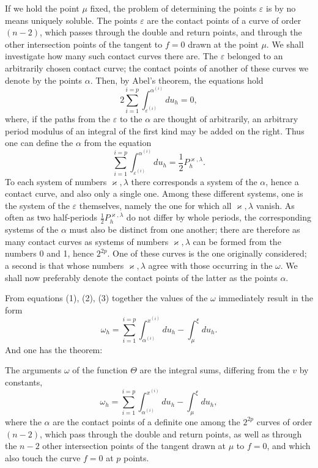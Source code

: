 \documentclass[10pt]{article}
\begin{document}
If we hold the point \(\mu\) fixed, the problem of determining the points \(\varepsilon\) is by no means uniquely soluble. The points \(\varepsilon\) are the contact points of a curve of order \((n-2)\), which passes through the double and return points, and through the other intersection points of the tangent to \(f=0\) drawn at the point \(\mu\). We shall investigate how many such contact curves there are. The \(\varepsilon\) belonged to an arbitrarily chosen contact curve; the contact points of another of these curves we denote by the points \(\alpha\). Then, by Abel's theorem, the equations hold
\[
2\sum_{i=1}^{i=p}\int_{\varepsilon^{(i)}}^{\alpha^{(i)}}du_h=0,
\]
where, if the paths from the \(\varepsilon\) to the \(\alpha\) are thought of arbitrarily, an arbitrary period modulus of an integral of the first kind may be added on the right. Thus one can define the \(\alpha\) from the equation
\[
\tag{3}\sum_{i=1}^{i=p}\int_{\varepsilon^{(i)}}^{\alpha^{(i)}}du_h=\frac12P_h^{\varkappa,\lambda}.
\]
To each system of numbers \(\varkappa,\lambda\) there corresponds a system of the \(\alpha\), hence a contact curve, and also only a single one. Among these different systems, one is the system of the \(\varepsilon\) themselves, namely the one for which all \(\varkappa,\lambda\) vanish. As often as two half-periods \(\frac12P_h^{\varkappa,\lambda}\) do not differ by whole periods, the corresponding systems of the \(\alpha\) must also be distinct from one another; there are therefore as many contact curves as systems of numbers \(\varkappa,\lambda\) can be formed from the numbers 0 and 1, hence \(2^{2p}\). One of these curves is the one originally considered; a second is that whose numbers \(\varkappa,\lambda\) agree with those occurring in the \(\omega\). We shall now preferably denote the contact points of the latter as the points \(\alpha\).

From equations (1), (2), (3) together the values of the \(\omega\) immediately result in the form
\[
\omega_h=\sum_{i=1}^{i=p}\int_{\alpha^{(i)}}^{x^{(i)}}du_h-\int_{\mu}^{\xi}du_h.
\]
And one has the theorem:

The arguments \(\omega\) of the function \(\Theta\) are the integral sums, differing from the \(v\) by constants,
\[
\omega_h=\sum_{i=1}^{i=p}\int_{\alpha^{(i)}}^{x^{(i)}}du_h-\int_{\mu}^{\xi}du_h,
\]
where the \(\alpha\) are the contact points of a definite one among the \(2^{2p}\) curves of order \((n-2)\), which pass through the double and return points, as well as through the \(n-2\) other intersection points of the tangent drawn at \(\mu\) to \(f=0\), and which also touch the curve \(f=0\) at \(p\) points.
\end{document}

